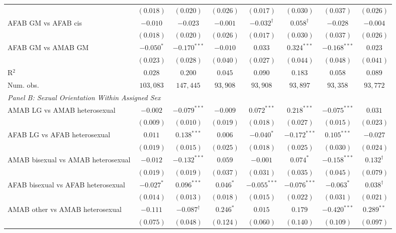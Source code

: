 \begin{table}[htpb!]
{\begin{tabular}{l c c c c c c c}
 & $(0.018)$ & $(0.020)$ & $(0.026)$ & $(0.017)$ & $(0.030)$ & $(0.037)$ & $(0.026)$ \\
AFAB GM vs AFAB cis & $-0.010$ & $-0.023$ & $-0.001$ & $-0.032^{\dagger}$ & $0.058^{\dagger}$ & $-0.028$ & $-0.004$ \\
 & $(0.018)$ & $(0.020)$ & $(0.026)$ & $(0.017)$ & $(0.030)$ & $(0.037)$ & $(0.026)$ \\
AFAB GM vs AMAB GM & $-0.050^{*}$ & $-0.170^{***}$ & $-0.010$ & $0.033$ & $0.324^{***}$ & $-0.168^{***}$ & $0.023$ \\
 & $(0.023)$ & $(0.028)$ & $(0.040)$ & $(0.027)$ & $(0.044)$ & $(0.048)$ & $(0.041)$ \\
\hline
R$^2$ & $0.028$ & $0.200$ & $0.045$ & $0.090$ & $0.183$ & $0.058$ & $0.089$ \\
Num. obs. & $103,083$ & $147,445$ & $93,908$ & $93,908$ & $93,897$ & $93,358$ & $93,772$ \\
\hline
\multicolumn{8}{l}{\textit{Panel B: Sexual Orientation Within Assigned Sex}} \\
AMAB LG vs AMAB heterosexual & $-0.002$ & $-0.079^{***}$ & $-0.009$ & $0.072^{***}$ & $0.218^{***}$ & $-0.075^{***}$ & $0.031$ \\
 & $(0.009)$ & $(0.010)$ & $(0.019)$ & $(0.018)$ & $(0.027)$ & $(0.015)$ & $(0.023)$ \\
AFAB LG vs AFAB heterosexual & $0.011$ & $0.138^{***}$ & $0.006$ & $-0.040^{*}$ & $-0.172^{***}$ & $0.105^{***}$ & $-0.027$ \\
 & $(0.019)$ & $(0.015)$ & $(0.025)$ & $(0.018)$ & $(0.025)$ & $(0.030)$ & $(0.024)$ \\
AMAB bisexual vs AMAB heterosexual & $-0.012$ & $-0.132^{***}$ & $0.059$ & $-0.001$ & $0.074^{*}$ & $-0.158^{***}$ & $0.132^{\dagger}$ \\
 & $(0.019)$ & $(0.019)$ & $(0.037)$ & $(0.031)$ & $(0.035)$ & $(0.045)$ & $(0.079)$ \\
AFAB bisexual vs AFAB heterosexual & $-0.027^{*}$ & $0.096^{***}$ & $0.046^{*}$ & $-0.055^{***}$ & $-0.076^{***}$ & $-0.063^{*}$ & $0.038^{\dagger}$ \\
 & $(0.014)$ & $(0.013)$ & $(0.018)$ & $(0.015)$ & $(0.022)$ & $(0.031)$ & $(0.021)$ \\
AMAB other vs AMAB heterosexual & $-0.111$ & $-0.087^{\dagger}$ & $0.246^{*}$ & $0.015$ & $0.179$ & $-0.420^{***}$ & $0.289^{**}$ \\
 & $(0.075)$ & $(0.048)$ & $(0.124)$ & $(0.060)$ & $(0.140)$ & $(0.109)$ & $(0.097)$ \\

\end{tabular}}
\end{table}
